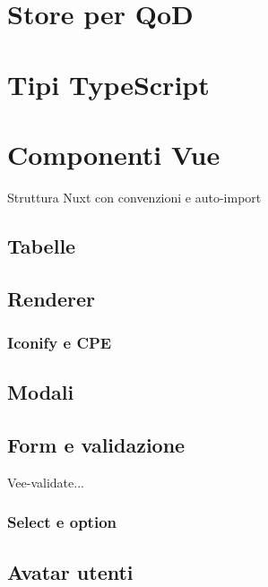 \section{Store per QoD}

\section{Tipi TypeScript}

\section{Componenti Vue}
Struttura Nuxt con convenzioni e auto-import
\subsection{Tabelle}
\subsection{Renderer}
\subsubsection{Iconify e CPE}
\subsection{Modali}
\subsection{Form e validazione}
Vee-validate...
\subsubsection{Select e option}
\subsection{Avatar utenti}
